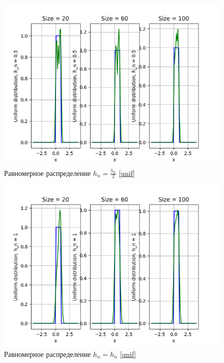 \documentclass[a4paper]{article}
\begin{document}
        \begin{figure}[H]
            \centering
            \includegraphics[scale = 0.4]{Uniform distribution, h_n = 0.5.png}
            \caption{Равномерное распределение $h_n = \frac{h_n}{2}$ \eqref{unif}}
            \label{fig:cauchy}
        \end{figure}
        
        \begin{figure}[H]
            \centering
            \includegraphics[scale = 0.4]{Uniform distribution, h_n = 1.png}
            \caption{Равномерное распределение $h_n = h_n$ \eqref{unif}}
            \label{fig:cauchy}
        \end{figure}
        
\end{document}
